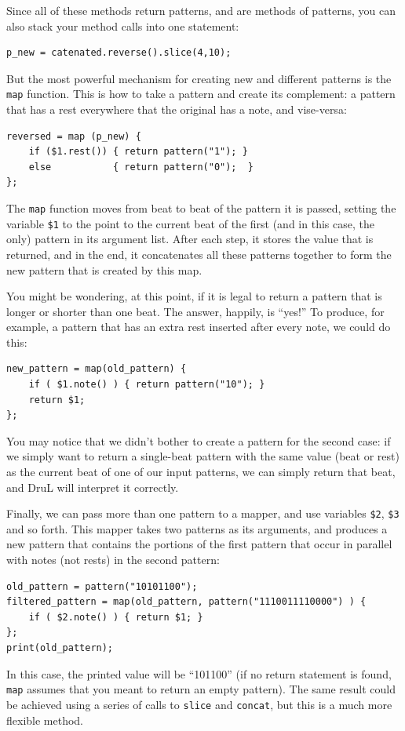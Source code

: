 Since all of these methods return patterns, and are methods of patterns, you can also stack your method calls into one statement:

\begin{lstlisting}
p_new = catenated.reverse().slice(4,10);
\end{lstlisting}

But the most powerful mechanism for creating new and different patterns is the {\tt map} function.  This is how to take a pattern and create its complement: a pattern that has a rest everywhere that the original has a note, and vise-versa:

\begin{lstlisting}
reversed = map (p_new) {
    if ($1.rest()) { return pattern("1"); }
    else 	       { return pattern("0");  }
};
\end{lstlisting}

The {\tt map} function moves from beat to beat of the pattern it is passed, setting the variable {\tt \$1} to the point to the current beat of the first (and in this case, the only) pattern in its argument list.  After each step, it stores the value that is returned, and in the end, it concatenates all these patterns together to form the new pattern that is created by this map.  

You might be wondering, at this point, if it is legal to return a pattern that is longer or shorter than one beat.  The answer, happily, is ``yes!''  To produce, for example, a pattern that has an extra rest inserted after every note, we could do this:

\begin{lstlisting}
new_pattern = map(old_pattern) {
	if ( $1.note() ) { return pattern("10"); }
	return $1;
};
\end{lstlisting}
You may notice that we didn't bother to create a pattern for the second case: if we simply want to return a single-beat pattern with the same value (beat or rest) as the current beat of one of our input patterns, we can simply return that beat, and DruL will interpret it correctly.

Finally, we can pass more than one pattern to a mapper, and use variables {\tt \$2}, {\tt \$3} and so forth.  This mapper takes two patterns as its arguments, and produces a new pattern that contains the portions of the first pattern that occur in parallel with notes (not rests) in the second pattern:
\begin{lstlisting}
old_pattern = pattern("10101100");
filtered_pattern = map(old_pattern, pattern("1110011110000") ) {
	if ( $2.note() ) { return $1; }
};
print(old_pattern);
\end{lstlisting}
In this case, the printed value will be ``101100'' (if no return statement is found, {\tt map} assumes that you meant to return an empty pattern).
The same result could be achieved using a series of calls to {\tt slice} and {\tt concat}, but this is a much more flexible method.

